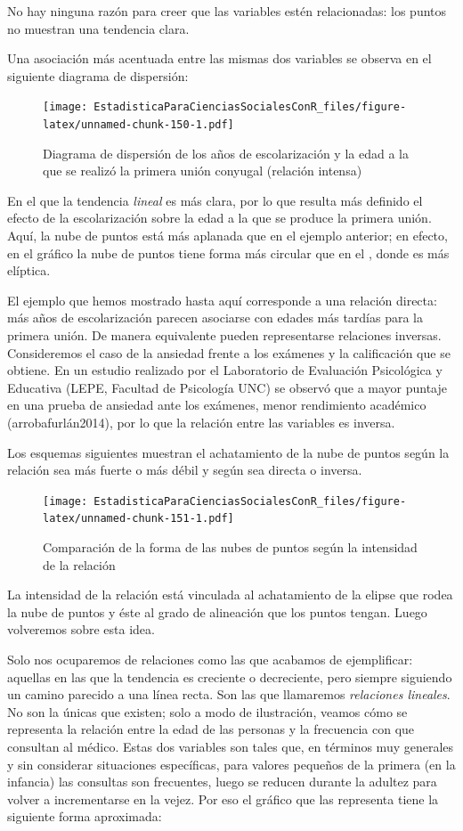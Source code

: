 \documentclass[]{book}
\begin{document}
No hay ninguna razón para creer que las variables estén relacionadas:
los puntos no muestran una tendencia clara.

Una asociación más acentuada entre las mismas dos variables se observa en el siguiente diagrama de dispersión:

\begin{figure}
\centering
\texttt{[image: EstadisticaParaCienciasSocialesConR\_files/figure-latex/unnamed-chunk-150-1.pdf]}
\caption{\label{fig:unnamed-chunk-150}Diagrama de dispersión de los años de escolarización y la edad a la que se realizó la primera unión conyugal (relación intensa)}
\end{figure}

En el que la tendencia \emph{lineal} es más clara, por lo que resulta más
definido el efecto de la escolarización sobre la edad a la que se
produce la primera unión. Aquí, la nube de puntos está más aplanada que en el ejemplo anterior; en efecto, en el gráfico la nube de puntos tiene forma más circular que en el , donde es más elíptica.

El ejemplo que hemos mostrado hasta aquí corresponde a una relación directa: más años de escolarización parecen asociarse con edades más tardías para la primera unión. De manera equivalente pueden representarse relaciones inversas. Consideremos el caso de la ansiedad frente a los exámenes y la calificación que se obtiene. En un estudio realizado por el Laboratorio de Evaluación Psicológica y Educativa (LEPE, Facultad de Psicología UNC) se observó que a mayor puntaje en una prueba de ansiedad ante los exámenes, menor rendimiento académico (arrobafurlán2014), por lo que la relación entre las variables es inversa.

Los esquemas siguientes muestran el achatamiento de la nube de puntos según la relación sea más fuerte o más débil y según sea directa o inversa.

\begin{figure}
\centering
\texttt{[image: EstadisticaParaCienciasSocialesConR\_files/figure-latex/unnamed-chunk-151-1.pdf]}
\caption{\label{fig:unnamed-chunk-151}Comparación de la forma de las nubes de puntos según la intensidad de la relación}
\end{figure}

La intensidad de la relación está vinculada al achatamiento de la elipse
que rodea la nube de puntos y éste al grado de alineación que los puntos
tengan. Luego volveremos sobre esta idea.

Solo nos ocuparemos de relaciones como las que acabamos de ejemplificar:
aquellas en las que la tendencia es creciente o decreciente, pero
siempre siguiendo un camino parecido a una línea recta. Son las que
llamaremos \emph{relaciones lineales}. No son la únicas que existen; solo a
modo de ilustración, veamos cómo se representa la relación entre la edad
de las personas y la frecuencia con que consultan al médico. Estas dos
variables son tales que, en términos muy generales y sin considerar
situaciones específicas, para valores pequeños de la primera (en la
infancia) las consultas son frecuentes, luego se reducen durante la
adultez para volver a incrementarse en la vejez. Por eso el gráfico que las representa tiene la siguiente forma aproximada:
\end{document}
